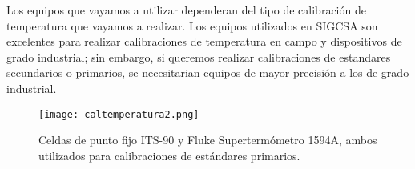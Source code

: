 \par \noindent
Los equipos que vayamos a utilizar dependeran del tipo de calibración de temperatura que vayamos a realizar. Los equipos utilizados en SIGCSA son excelentes para realizar calibraciones de temperatura en campo y dispositivos de grado industrial; sin embargo, si queremos realizar calibraciones de estandares secundarios o primarios, se necesitarian equipos de mayor precisión a los de grado industrial.

\begin{figure}[H]
	\centering
	\texttt{[image: caltemperatura2.png]}
	\caption{Celdas de punto fijo ITS-90 y Fluke Supertermómetro 1594A, ambos utilizados para calibraciones de estándares primarios.}
\end{figure}



